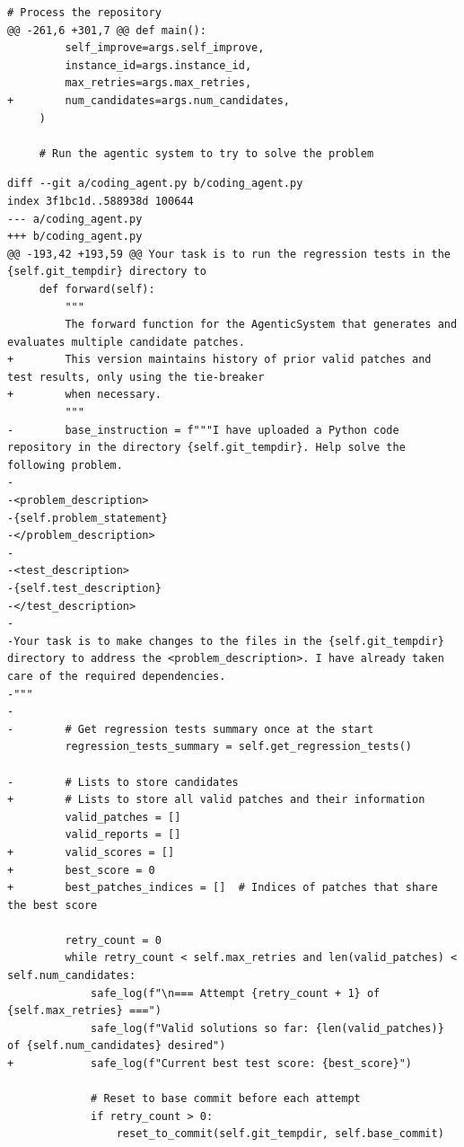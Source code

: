 \documentclass{article}
\begin{document}
\begin{lstlisting}[style=diffstyle]
     # Process the repository
@@ -261,6 +301,7 @@ def main():
         self_improve=args.self_improve,
         instance_id=args.instance_id,
         max_retries=args.max_retries,
+        num_candidates=args.num_candidates,
     )
 
     # Run the agentic system to try to solve the problem
\end{lstlisting}


\begin{lstlisting}[style=diffstyle]
diff --git a/coding_agent.py b/coding_agent.py
index 3f1bc1d..588938d 100644
--- a/coding_agent.py
+++ b/coding_agent.py
@@ -193,42 +193,59 @@ Your task is to run the regression tests in the {self.git_tempdir} directory to
     def forward(self):
         """
         The forward function for the AgenticSystem that generates and evaluates multiple candidate patches.
+        This version maintains history of prior valid patches and test results, only using the tie-breaker
+        when necessary.
         """
-        base_instruction = f"""I have uploaded a Python code repository in the directory {self.git_tempdir}. Help solve the following problem.
-
-<problem_description>
-{self.problem_statement}
-</problem_description>
-
-<test_description>
-{self.test_description}
-</test_description>
-
-Your task is to make changes to the files in the {self.git_tempdir} directory to address the <problem_description>. I have already taken care of the required dependencies.
-"""
-
-        # Get regression tests summary once at the start
         regression_tests_summary = self.get_regression_tests()
 
-        # Lists to store candidates
+        # Lists to store all valid patches and their information
         valid_patches = []
         valid_reports = []
+        valid_scores = []
+        best_score = 0
+        best_patches_indices = []  # Indices of patches that share the best score
 
         retry_count = 0
         while retry_count < self.max_retries and len(valid_patches) < self.num_candidates:
             safe_log(f"\n=== Attempt {retry_count + 1} of {self.max_retries} ===")
             safe_log(f"Valid solutions so far: {len(valid_patches)} of {self.num_candidates} desired")
+            safe_log(f"Current best test score: {best_score}")
 
             # Reset to base commit before each attempt
             if retry_count > 0:
                 reset_to_commit(self.git_tempdir, self.base_commit)
             

\end{lstlisting}
\end{document}
